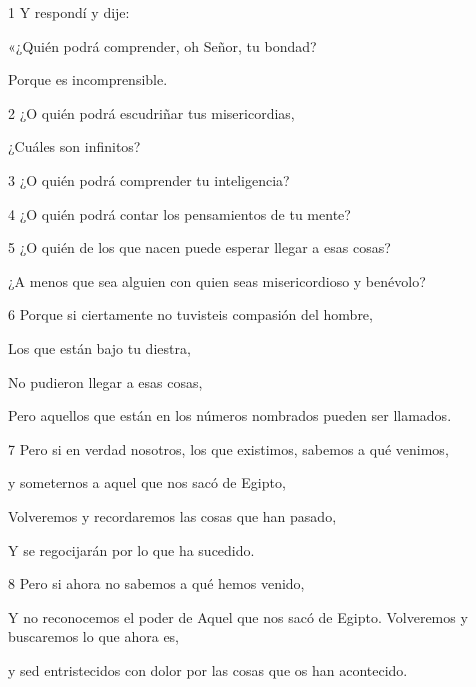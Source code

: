 \par 1 Y respondí y dije:

\par «¿Quién podrá comprender, oh Señor, tu bondad?

\par Porque es incomprensible.

\par 2 ¿O quién podrá escudriñar tus misericordias,

\par ¿Cuáles son infinitos?

\par 3 ¿O quién podrá comprender tu inteligencia?

\par 4 ¿O quién podrá contar los pensamientos de tu mente?

\par 5 ¿O quién de los que nacen puede esperar llegar a esas cosas?

\par ¿A menos que sea alguien con quien seas misericordioso y benévolo?

\par 6 Porque si ciertamente no tuvisteis compasión del hombre,

\par Los que están bajo tu diestra,

\par No pudieron llegar a esas cosas,

\par Pero aquellos que están en los números nombrados pueden ser llamados.

\par 7 Pero si en verdad nosotros, los que existimos, sabemos a qué venimos,

\par y someternos a aquel que nos sacó de Egipto,

\par Volveremos y recordaremos las cosas que han pasado,

\par Y se regocijarán por lo que ha sucedido.

\par 8 Pero si ahora no sabemos a qué hemos venido,

\par Y no reconocemos el poder de Aquel que nos sacó de Egipto. Volveremos y buscaremos lo que ahora es,

\par y sed entristecidos con dolor por las cosas que os han acontecido.

